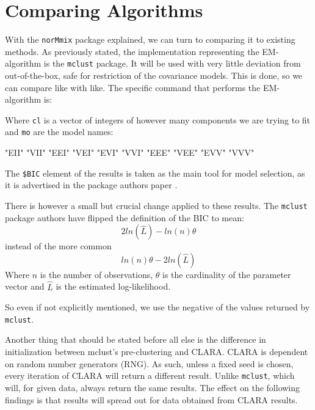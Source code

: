 \chapter{Comparing Algorithms}


With the {\tt norMmix} package explained, we can turn to comparing it to 
existing methods. As previously stated, the implementation representing the 
EM-algorithm is the {\tt mclust} package. It will be used with very little 
deviation from out-of-the-box, safe for restriction of the covariance models.
This is done, so we can compare like with like.
The specific command that performs the EM-algorithm is:

\begin{Schunk}
\end{Schunk}

Where {\tt cl} is a vector of integers of however many components we are trying 
to fit and {\tt mo} are the model names:

\begin{Schunk}
\begin{Soutput}
 [1] "EII" "VII" "EEI" "VEI" "EVI" "VVI" "EEE" "VEE" "EVV" "VVV"
\end{Soutput}
\end{Schunk}

The {\tt \$BIC} element of the results is taken as the main tool for model 
selection, as it is advertised in the package authors paper \cite{Scr16}.

There is however a small but crucial change applied to these results.
The {\tt mclust} package authors have flipped the definition of the BIC to mean:
\[ 2 ln(\hat{L}) - ln(n) \theta\]
instead of the more common
\[ ln(n) \theta - 2 ln(\hat{L}) \]
Where $n$ is the number of observations, $\theta$ is the cardinality of the 
parameter vector and $$ is the estimated log-likelihood.

So even if not explicitly mentioned, we use the negative of the values returned
by {\tt mclust}.

Another thing that should be stated before all else is the difference in 
initialization between {mclust}'s pre-clustering and CLARA. CLARA is dependent
on random number generators (RNG). As such, unless a fixed seed is chosen, 
every iteration of CLARA will return a different result. Unlike {\tt mclust}, 
which will, for given data, always return the same results. The effect on the 
following findings is that results will spread out for data obtained from 
CLARA results.


